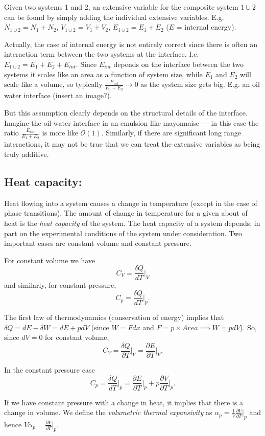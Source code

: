 Given two systems 1 and 2, an extensive variable for the composite system $1\cup2$ can be found by simply adding the individual extensive variables. E.g. $N_{1\cup2} = N_1 + N_2$, $V_{1\cup2} = V_1 + V_2$, $E_{1\cup2} = E_1 + E_2$ ($E$ = internal energy).

Actually, the case of internal energy is not entirely correct since there is often an interaction term between the two systems at the interface. I.e. $E_{1\cup2} = E_1+E_2+E_{int}$. Since $E_{int}$ depends on the interface between the two systems it scales like an area as a function of system size, while $E_1$ and $E_2$ will scale like a volume, so typically $\frac{E_{int}}{E_1+E_2}\rightarrow0$ as the system size gets big. E.g. an oil water interface (insert an image?).

But this assumption clearly depends on the structural details of the interface. Imagine the oil-water interface in an emulsion like mayonnaise --- in this case the ratio  $\frac{E_{int}}{E_1+E_2}$ is more like $\mathcal{O}(1)$.
Similarly, if there are significant long range interactions, it may not be true that we can treat the extensive variables as being truly additive.

\subsection{Heat capacity:}
Heat flowing into a system causes a change in temperature (except in the case of phase transitions). The amount of change in temperature for a given about of heat is the \emph{heat capacity} of the system. The heat capacity of a system depends, in part on the experimental conditions of the system under consideration. Two important cases are constant volume and constant pressure.

For constant volume we have
$$C_V = \frac{\delta Q}{dT}\bigg\vert_V$$
and similarly, for constant pressure,
$$C_p = \frac{\delta Q}{dT}\bigg\vert_p.$$

The first law of thermodynamics (conservation of energy) implies that $\delta Q = dE - \delta W = dE + pdV$  (since $W = Fdx$ and $F=p\times Area \implies W = pdV$). So, since $dV=0$ for constant volume,
$$
	C_V = \frac{\delta Q}{\partial T}\bigg\vert_{V} = \frac{\partial E}{\partial T}\bigg\vert_{V}.
$$


In the constant pressure case 
$$
	C_p = \frac{\delta Q}{dT}\bigg\vert_{p} = \frac{\partial E}{\partial T}\bigg\vert_{p} + p\frac{\partial V}{\partial T}\bigg\vert_{p}.
$$

If we have constant pressure with a change in heat, it implies that there is a change in volume. We define the \emph{volumetric thermal expansivity} as $\alpha_p = \frac{1}{V}\frac{\partial V}{\partial T}\vert_{p}$ and hence $V\alpha_p =\frac{\partial V}{\partial T}\vert_{p}$.

